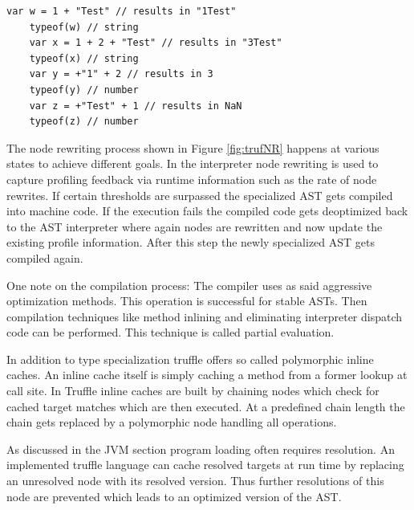 \begin{lstlisting}[caption={JavaScript addition types minimal example}, label={lst:jsTypes}]
	var w = 1 + "Test" // results in "1Test"
	typeof(w) // string
	var x = 1 + 2 + "Test" // results in "3Test"
	typeof(x) // string
	var y = +"1" + 2 // results in 3
	typeof(y) // number
	var z = +"Test" + 1 // results in NaN
	typeof(z) // number
\end{lstlisting}

The node rewriting process shown in Figure \ref{fig:trufNR} happens at various states to achieve different goals. In the interpreter node rewriting is used to capture profiling feedback via runtime information such as the rate of node rewrites. If certain thresholds are surpassed the specialized AST gets compiled into machine code. If the execution fails the compiled code gets deoptimized back to the AST interpreter where again nodes are rewritten and now update the existing profile information. After this step the newly specialized AST gets compiled again. \cite{wuerthSelf}

One note on the compilation process: The compiler uses as said aggressive optimization methods. This operation is successful for stable ASTs. Then compilation techniques like method inlining and eliminating interpreter dispatch code can be performed. This technique is called partial evaluation.

In addition to type specialization truffle offers so called polymorphic inline caches. \cite{ChambOpti} An inline cache itself is simply caching a method from a former lookup at call site. In Truffle inline caches are built by chaining nodes which check for cached target matches which are then executed. At a predefined chain length the chain gets replaced by a polymorphic node handling all operations.

As discussed in the JVM section program loading often requires resolution. An implemented truffle language can cache resolved targets at run time by replacing an unresolved node with its resolved version. Thus further resolutions of this node are prevented which leads to an optimized version of the AST.

